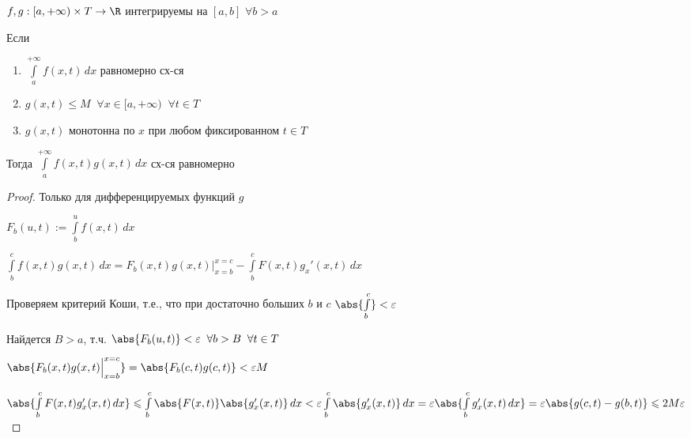 
\begin{theorem}\thmslashn
	
	$f, g: [a, +\infty)\times T \to \R$ интегрируемы на $[a, b]$ $\forall b > a$
	
	Если \begin{enumerate}[1)]
		\item 
		$\int\limits_{a}^{+\infty} f(x, t)\,dx$ равномерно сх-ся
		
		\item
		$g(x, t) \leqslant M \;\; \forall x\in [a, +\infty) \;\; \forall t \in T$
		
		\item
		$g(x, t)$ монотонна по $x$ при любом фиксированном $t \in T$
	\end{enumerate}
	
	Тогда $\int\limits_{a}^{+\infty} f(x, t)g(x, t)\,dx$ сх-ся равномерно
	
\end{theorem}

\begin{proof}
	Только для дифференцируемых  функций $g$ 
	
	$F_b(u, t) := \int\limits_{b}^{u} f(x, t)\,dx$
	
	$\int\limits_{b}^{c} f(x, t)g(x, t) \, dx = F_b(x, t)g(x, t) \Big|_{x = b}^{x = c} - \int\limits_{b}^{c} F(x, t)g_x'(x, t) \, dx$
	
	Проверяем критерий Коши, т.е., что при достаточно больших $b$ и $c$ $\abs{\int\limits_b^c} < \varepsilon$
	
	Найдется $B > a$, т.ч. $\abs{F_b(u, t)} < \varepsilon\;\; \forall b > B\;\; \forall t \in T$
	
	$\abs{F_b(x, t)g(x, t) \Big|_{x = b}^{x = c}} = \abs{F_b(c, t)g(c, t)} < \varepsilon M$
	
	$\abs{\int\limits_{b}^{c} F(x, t)g_x'(x, t) \, dx} \leqslant \int\limits_{b}^{c} \abs{F(x, t)}\abs{g_x'(x, t)} \, dx < \varepsilon \int\limits_{b}^{c} \abs{g_x'(x, t)} \, dx = \varepsilon \abs{\int\limits_{b}^{c} g_x'(x, t) \, dx} = \varepsilon \abs{g(c, t) - g(b, t)} \leqslant 2M\varepsilon$
	
	
\end{proof}